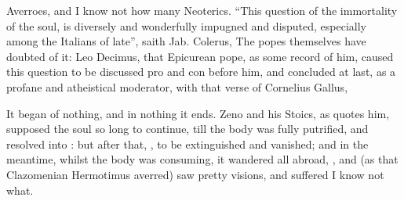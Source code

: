 Averroes, and I know not how many Neoterics. \enquote{This
question of the immortality of the soul, is diversely and wonderfully impugned
and disputed, especially among the Italians of late}, saith Jab. Colerus,
 The popes themselves
have doubted of it: Leo Decimus, that Epicurean pope, as
some record of him, caused this question to be discussed
pro and con before him, and concluded at last, as a profane and atheistical
moderator, with that verse of Cornelius Gallus,

%

It began of nothing, and in nothing it ends. Zeno and his Stoics, as
\Austin{} quotes him, supposed the soul so long to continue,
till the body was fully putrified, and resolved into : but
after that, , to be extinguished and vanished; and in
the meantime, whilst the body was consuming, it wandered all abroad, , and (as that Clazomenian Hermotimus averred) saw
pretty visions, and suffered I know not what.


